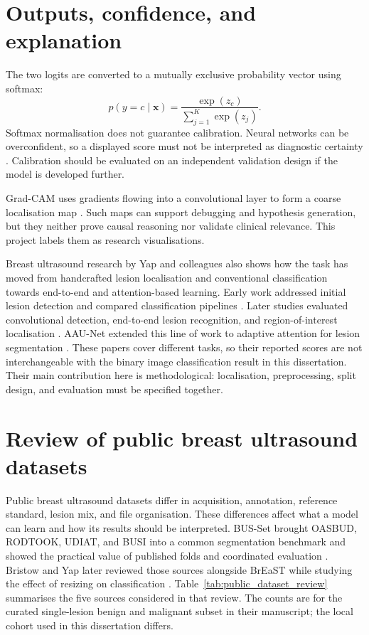 \section{Outputs, confidence, and explanation}
The two logits are converted to a mutually exclusive probability vector using softmax:
\begin{equation}
p(y=c\mid\mathbf{x})=\frac{\exp(z_c)}{\sum_{j=1}^{K}\exp(z_j)}.
\end{equation}
Softmax normalisation does not guarantee calibration. Neural networks can be overconfident, so a displayed score must not be interpreted as diagnostic certainty \citep{Guo2017}. Calibration should be evaluated on an independent validation design if the model is developed further.

Grad-CAM uses gradients flowing into a convolutional layer to form a coarse localisation map \citep{Selvaraju2017}. Such maps can support debugging and hypothesis generation, but they neither prove causal reasoning nor validate clinical relevance. This project labels them as research visualisations.

Breast ultrasound research by Yap and colleagues also shows how the task has moved from handcrafted lesion localisation and conventional classification towards end-to-end and attention-based learning. Early work addressed initial lesion detection and compared classification pipelines \citep{Yap2008,Yap2009}. Later studies evaluated convolutional detection, end-to-end lesion recognition, and region-of-interest localisation \citep{Yap2018,Yap2019,Yap2020ROI}. AAU-Net extended this line of work to adaptive attention for lesion segmentation \citep{Chen2023}. These papers cover different tasks, so their reported scores are not interchangeable with the binary image classification result in this dissertation. Their main contribution here is methodological: localisation, preprocessing, split design, and evaluation must be specified together.

\section{Review of public breast ultrasound datasets}
\label{sec:dataset_review}

Public breast ultrasound datasets differ in acquisition, annotation, reference standard, lesion mix, and file organisation. These differences affect what a model can learn and how its results should be interpreted. BUS-Set brought OASBUD, RODTOOK, UDIAT, and BUSI into a common segmentation benchmark and showed the practical value of published folds and coordinated evaluation \citep{Thomas2023}. Bristow and Yap later reviewed those sources alongside BrEaST while studying the effect of resizing on classification \citep{Bristow2026}. Table~\ref{tab:public_dataset_review} summarises the five sources considered in that review. The counts are for the curated single-lesion benign and malignant subset in their manuscript; the local cohort used in this dissertation differs.

